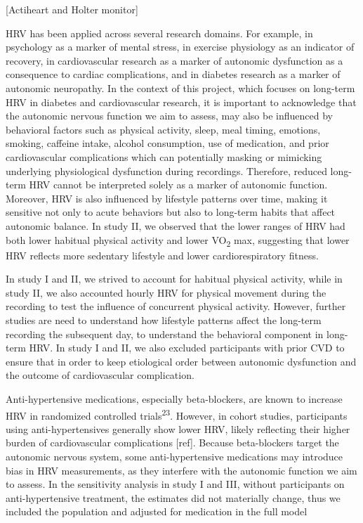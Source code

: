 \documentclass[
  a4paper,
  headsepline=true,
  open=any]{scrbook}
\begin{document}
{[}Actiheart and Holter monitor{]}

HRV has been applied across several research domains. For example, in
psychology as a marker of mental stress, in exercise physiology as an
indicator of recovery, in cardiovascular research as a marker of
autonomic dysfunction as a consequence to cardiac complications, and in
diabetes research as a marker of autonomic neuropathy. In the context of
this project, which focuses on long-term HRV in diabetes and
cardiovascular research, it is important to acknowledge that the
autonomic nervous function we aim to assess, may also be influenced by
behavioral factors such as physical activity, sleep, meal timing,
emotions, smoking, caffeine intake, alcohol consumption, use of
medication, and prior cardiovascular complications which can potentially
masking or mimicking underlying physiological dysfunction during
recordings. Therefore, reduced long-term HRV cannot be interpreted
solely as a marker of autonomic function. Moreover, HRV is also
influenced by lifestyle patterns over time, making it sensitive not only
to acute behaviors but also to long-term habits that affect autonomic
balance. In study II, we observed that the lower ranges of HRV had both
lower habitual physical activity and lower VO\textsubscript{2} max,
suggesting that lower HRV reflects more sedentary lifestyle and lower
cardiorespiratory fitness.

In study I and II, we strived to account for habitual physical activity,
while in study II, we also accounted hourly HRV for physical movement
during the recording to test the influence of concurrent physical
activity. However, further studies are need to understand how lifestyle
patterns affect the long-term recording the subsequent day, to
understand the behavioral component in long-term HRV. In study I and II,
we also excluded participants with prior CVD to ensure that in order to
keep etiological order between autonomic dysfunction and the outcome of
cardiovascular complication.

Anti-hypertensive medications, especially beta-blockers, are known to
increase HRV in randomized controlled trials\textsuperscript{23}.
However, in cohort studies, participants using anti-hypertensives
generally show lower HRV, likely reflecting their higher burden of
cardiovascular complications {[}ref{]}. Because beta-blockers target the
autonomic nervous system, some anti-hypertensive medications may
introduce bias in HRV measurements, as they interfere with the autonomic
function we aim to assess. In the sensitivity analysis in study I and
III, without participants on anti-hypertensive treatment, the estimates
did not materially change, thus we included the population and adjusted
for medication in the full model
\end{document}
